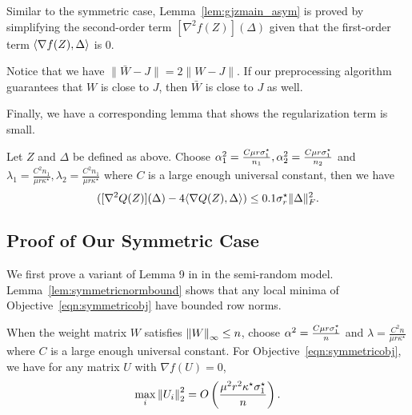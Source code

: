 Similar to the symmetric case, Lemma~\ref{lem:gjzmain_asym} is proved by simplifying the second-order term $[\nabla^2 f(Z)](\Delta)$ given that the first-order term $\langle \nabla f(Z), \Delta\rangle$ is 0.

Notice that we have $\|\bar{W} - J\| = 2\|W-J\|$.
If our preprocessing algorithm guarantees that $W$ is close to $J$, then $\bar W$ is close to $J$ as well.

Finally, we have a corresponding lemma that shows the regularization term is small.

\begin{lemma}\label{lem:extra_bound_asymmetric}
Let $Z$ and $\Delta$ be defined as above.
Choose $\alpha_1^2 = \frac{C\mu r\sigma^\star_1}{n_1},\alpha_2^2 = \frac{C\mu r\sigma^\star_1}{n_2}$ and $\lambda_1 = \frac{C^2 n_1}{\mu r\kappa^\star},\lambda_2 = \frac{C^2 n_1}{\mu r\kappa^\star}$ where $C$ is a large enough universal constant, then we have
\[
([\nabla^2 Q(Z)](\Delta) -4\langle \nabla Q(Z),\Delta\rangle) \le 0.1\sigma^\star_r \|\Delta\|_F^2.
\]
\end{lemma}



\subsection{Proof of Our Symmetric Case}
\label{app:matrix-symmetric}
We first prove a variant of Lemma 9 in \citep{GeJZ17} in the semi-random model. Lemma~\ref{lem:symmetricnormbound} shows that any local minima of Objective~\eqref{eqn:symmetricobj} have bounded row norms.

\newcommand{\grad}{\nabla}
\newcommand{\poly}{\mbox{poly}}

\begin{lemma} \label{lem:symmetricnormbound}
When the weight matrix $W$ satisfies ${\lVert W{\rVert}}_\infty \le n$, choose $\alpha^2 = \frac{C\mu r\sigma^\star_1}{n}$ and $\lambda = \frac{C^2 n}{\mu r\kappa^\star}$ where $C$ is a large enough universal constant. For Objective~\eqref{eqn:symmetricobj}, we have for any matrix $U$ with $\grad f (U) = 0$, 
\begin{equation*}
\max_{i}{\lVert U_i{\rVert}}_2^2 = O\left(\frac{\mu^2 r^2 \kappa^\star \sigma^\star_1}{n}\right).
\end{equation*}
\end{lemma}

